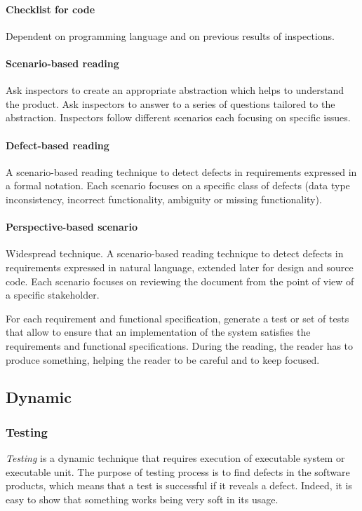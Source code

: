 \paragraph{Checklist for code}
Dependent on programming language and on previous results of inspections.

\paragraph{Scenario-based reading}
Ask inspectors to create an appropriate abstraction which helps to understand the product. Ask inspectors to answer to a series of questions tailored to the abstraction. Inspectors follow different scenarios each focusing on specific issues.

\paragraph{Defect-based reading}
A scenario-based reading technique to detect defects in requirements expressed in a formal notation. Each scenario focuses on a specific class of defects (data type inconsistency, incorrect functionality, ambiguity or missing functionality).

\paragraph{Perspective-based scenario} Widespread technique. A scenario-based reading technique to detect defects in requirements expressed in natural language, extended later for design and source code. Each scenario focuses on reviewing the document from the point of view of a specific stakeholder.

For each requirement and functional specification, generate a test or set of tests that allow to ensure that an implementation of the system satisfies the requirements and functional specifications. During the reading, the reader has to produce something, helping the reader to be careful and to keep focused.

\subsection{Dynamic}
\subsubsection{Testing}
\emph{Testing} is a dynamic technique that requires execution of executable system or executable unit. The purpose of testing process is to find defects in the software products, which means that a test is successful if it reveals a defect. Indeed, it is easy to show that something works being very soft in its usage.


